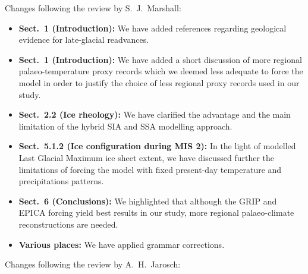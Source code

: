 Changes following the review by S.~J.~Marshall:

\begin{itemize}

    \item \textbf{Sect.~1 (Introduction):}
    We have added references regarding geological evidence for late-glacial
    readvances.

    \item \textbf{Sect.~1 (Introduction):}
    We have added a short discussion of more regional palaeo-temperature proxy
    records which we deemed less adequate to force the model in order to
    justify the choice of less regional proxy records used in our study.

    \item \textbf{Sect.~2.2 (Ice rheology):}
    We have clarified the advantage and the main limitation of the hybrid SIA
    and SSA modelling approach.

    \item \textbf{Sect.~5.1.2 (Ice configuration during MIS 2):}
    In the light of modelled Last Glacial Maximum ice sheet extent, we have
    discussed further the limitations of forcing the model with fixed
    present-day temperature and precipitations patterns.

    \item \textbf{Sect.~6 (Conclusions):}
    We highlighted that although the GRIP and EPICA forcing yield best results
    in our study, more regional palaeo-climate reconstructions are needed.

    \item \textbf{Various places:}
    We have applied grammar corrections.

\end{itemize}

Changes following the review by A.~H.~Jarosch:

